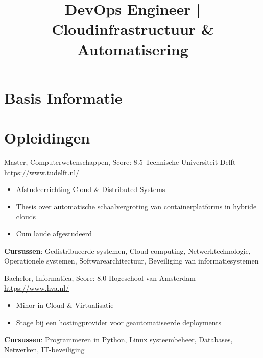 \documentclass[a4paper, serif, 10pt]{moderncv}
\title{DevOps Engineer | Cloudinfrastructuur \& Automatisering}
\begin{document}
\maketitle

\section{Basis Informatie}

\section{Opleidingen}

        {Master, Computerwetenschappen, Score: 8.5}
        {Technische Universiteit Delft}
        {\url{https://www.tudelft.nl/}}
        {}
        {\begin{itemize}
\item Afstudeerrichting Cloud \& Distributed Systems
\item Thesis over automatische schaalvergroting van containerplatforms in hybride clouds
\item Cum laude afgestudeerd
\end{itemize}
\textbf{Cursussen}: Gedistribueerde systemen, Cloud computing, Netwerktechnologie, Operationele systemen, Softwarearchitectuur, Beveiliging van informatiesystemen}

        {Bachelor, Informatica, Score: 8.0}
        {Hogeschool van Amsterdam}
        {\url{https://www.hva.nl/}}
        {}
        {\begin{itemize}
\item Minor in Cloud \& Virtualisatie
\item Stage bij een hostingprovider voor geautomatiseerde deployments
\end{itemize}
\textbf{Cursussen}: Programmeren in Python, Linux systeembeheer, Databases, Netwerken, IT-beveiliging}
\end{document}
